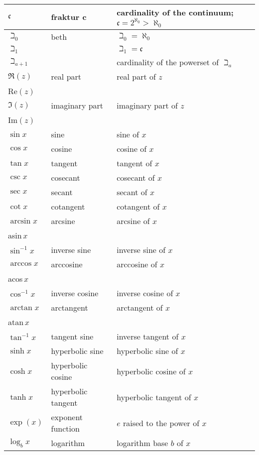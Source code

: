 \documentclass{article}
\begin{document}
\begin{longtable}{|| L{1.7cm} | L{3.5cm} | L{7cm} ||}
\(\mathfrak{c}\) & fraktur c & cardinality of the continuum; \(\mathfrak{c}=2^{\aleph_{0}}>\aleph_{0}\)\\
\hline
\(\beth_{0}\) & beth & \(\beth_{0}=\aleph_{0}\)\\
\(\beth_{1}\) & & \(\beth_{1}=\mathfrak{c}\)\\
\(\beth_{a+1}\) & & cardinality of the powerset of \(\beth_{a}\)\\
\hline
\(\Re{(z)}\) & real part & real part of \(z\)\\
Re\((z)\) & & \\
\hline
\(\Im{(z)}\) & imaginary part & imaginary part of \(z\)\\
Im\((z)\) & & \\
\hline
\(\sin{x}\) & sine & sine of \(x\)\\
\hline
\(\cos{x}\) & cosine & cosine of \(x\)\\
\hline
\(\tan{x}\) & tangent & tangent of \(x\)\\
\hline
\(\csc{x}\) & cosecant & cosecant of \(x\)\\
\hline
\(\sec{x}\) & secant & secant of \(x\)\\
\hline
\(\cot{x}\) & cotangent & cotangent of \(x\)\\
\hline
\(\arcsin{x}\) & arcsine & arcsine of \(x\)\\
asin\(\,x\) & & \\
\(\sin^{-1}{x}\) & inverse sine & inverse sine of \(x\)\\
\hline
\(\arccos{x}\) & arccosine & arccosine of \(x\)\\
acos\(\,x\) & & \\
\(\cos^{-1}{x}\) & inverse cosine & inverse cosine of \(x\)\\
\hline
\(\arctan{x}\) & arctangent & arctangent of \(x\)\\
atan\(\,x\) & & \\
\(\tan^{-1}{x}\) & tangent sine & inverse tangent of \(x\)\\
\hline
\(\sinh{x}\) & hyperbolic sine & hyperbolic sine of \(x\)\\
\hline
\(\cosh{x}\) & hyperbolic cosine & hyperbolic cosine of \(x\)\\
\hline
\(\tanh{x}\) & hyperbolic tangent & hyperbolic tangent of \(x\)\\
\hline
\(\exp({x})\) & exponent function & \(e\) raised to the power of \(x\)\\
\hline
\(\log_b{x}\) & logarithm & logarithm base \(b\) of \(x\)\\

\end{longtable}
\end{document}
